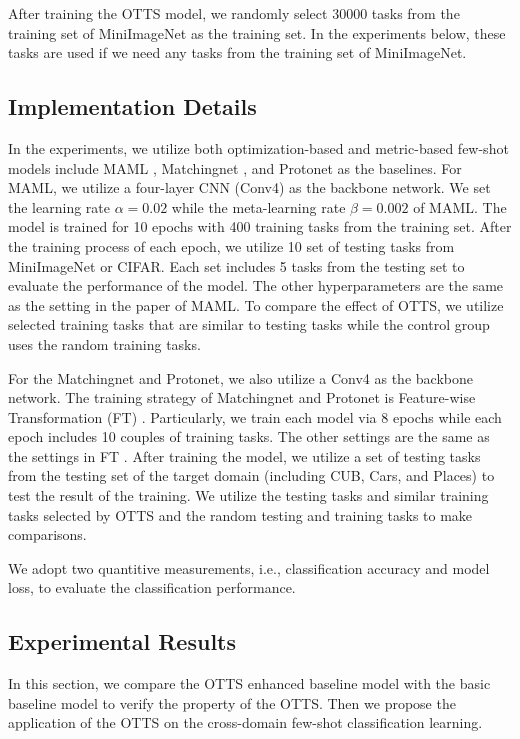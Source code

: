 \documentclass[10pt,journal,compsoc]{IEEEtran}
\begin{document}
After training the OTTS model, we randomly select 30000 tasks from the training set of MiniImageNet as the training set. In the experiments below, these tasks are used if we need any tasks from the training set of MiniImageNet.


\subsection{Implementation Details}

In the experiments, we utilize both optimization-based and metric-based few-shot models include MAML \cite{MAML}, Matchingnet \cite{matchingnet}, and Protonet \cite{protonet} as the baselines. For MAML, we utilize a four-layer CNN (Conv4) as the backbone network. We set the learning rate $\alpha=0.02$ while the meta-learning rate $\beta=0.002$ of MAML. The model is trained for 10 epochs with 400 training tasks from the training set. After the training process of each epoch, we utilize 10 set of testing tasks from MiniImageNet or CIFAR. Each set includes 5 tasks from the testing set to evaluate the performance of the model. The other hyperparameters are the same as the setting in the paper of MAML. To compare the effect of OTTS, we utilize selected training tasks that are similar to testing tasks while the control group uses the random training tasks.

For the Matchingnet and Protonet, we also utilize a Conv4 as the backbone network. The training strategy of Matchingnet and Protonet is Feature-wise Transformation (FT) \cite{ex3}. Particularly, we train each model via 8 epochs while each epoch includes 10 couples of training tasks. The other settings are the same as the settings in FT \cite{ex3}. After training the model, we utilize a set of testing tasks from the testing set of the target domain (including CUB, Cars, and Places) to test the result of the training. We utilize the testing tasks and similar training tasks selected by OTTS and the random testing and training tasks to make comparisons. 

We adopt two quantitive measurements, i.e., classification accuracy and model loss, to evaluate the classification performance.

\subsection{Experimental Results}

In this section, we compare the OTTS enhanced baseline model with the basic baseline model to verify the property of the OTTS. Then we propose the application of the OTTS on the cross-domain few-shot classification learning.
\end{document}
